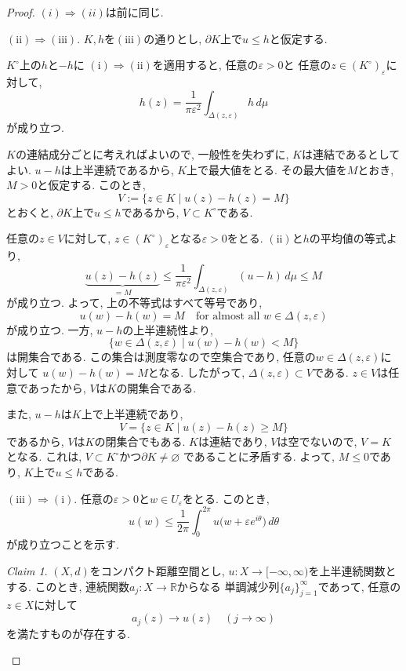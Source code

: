 \documentclass[dvipdfmx,a4paper,11pt]{report} %
\theoremstyle{definition}
\theoremstyle{remark}
\newtheorem{claim}[thm]{Claim}
\numberwithin{equation}{section}
\newcommand{\R}{\mathbb{R}}
\begin{document}
\begin{proof}
$(i) \Rightarrow (ii)$は前に同じ.

$\mathrm{(ii)} \Rightarrow \mathrm{(iii)}$.
$K,h$を$\mathrm{(iii)}$の通りとし,
$\partial K$上で$u \leq h$と仮定する.

$K^\circ$上の$h$と$-h$に
$\mathrm{(i)} \Rightarrow \mathrm{(ii)}$を適用すると,
任意の$\varepsilon > 0$と
任意の$z \in (K^\circ)_\varepsilon$に対して,
\[
h(z)
=
\frac{1}{\pi\varepsilon^2}
\int_{\Delta(z,\varepsilon)} h\,d\mu
\]
が成り立つ.

$K$の連結成分ごとに考えればよいので,
一般性を失わずに, $K$は連結であるとしてよい.
$u-h$は上半連続であるから,
$K$上で最大値をとる.
その最大値を$M$とおき, $M>0$と仮定する.
このとき,
\[
V:=\{z \in K \mid u(z)-h(z)=M\}
\]
とおくと, $\partial K$上で$u \leq h$であるから,
$V \subset K^\circ$である.

任意の$z \in V$に対して,
$z \in (K^\circ)_\varepsilon$となる$\varepsilon>0$をとる.
$\mathrm{(ii)}$と$h$の平均値の等式より,
\[
\underbrace{u(z)-h(z)}_{=M}
\leq
\frac{1}{\pi\varepsilon^2}
\int_{\Delta(z,\varepsilon)} (u-h)\,d\mu
\leq M
\]
が成り立つ.
よって, 上の不等式はすべて等号であり,
\[
u(w)-h(w)=M
\quad
\text{for almost all $w \in \Delta(z,\varepsilon)$}
\]
が成り立つ.
一方, $u-h$の上半連続性より,
\[
\{w \in \Delta(z,\varepsilon) \mid u(w)-h(w)<M\}
\]
は開集合である.
この集合は測度零なので空集合であり,
任意の$w \in \Delta(z,\varepsilon)$に対して
$u(w)-h(w)=M$となる.
したがって, $\Delta(z,\varepsilon) \subset V$である.
$z \in V$は任意であったから, $V$は$K$の開集合である.

また, $u-h$は$K$上で上半連続であり,
\[
V=\{z \in K \mid u(z)-h(z)\geq M\}
\]
であるから, $V$は$K$の閉集合でもある.
$K$は連結であり, $V$は空でないので, $V=K$となる.
これは, $V \subset K^\circ$かつ$\partial K \neq \varnothing$
であることに矛盾する.
よって, $M \leq 0$であり, $K$上で$u \leq h$である.

$\mathrm{(iii)} \Rightarrow \mathrm{(i)}$.
任意の$\varepsilon > 0$と$w \in U_\varepsilon$をとる.
このとき,
\[
u(w)
\leq
\frac{1}{2\pi}
\int_0^{2\pi}
u\bigl(w+\varepsilon e^{i\theta}\bigr)\,d\theta
\]
が成り立つことを示す.

\begin{tcolorbox}[mybox]
\begin{claim}
$(X,d)$をコンパクト距離空間とし,
$u \colon X \to [-\infty,\infty)$を上半連続関数とする.
このとき, 連続関数$a_j \colon X \to \R$からなる
単調減少列$\{a_j\}_{j=1}^{\infty}$であって,
任意の$z \in X$に対して
\[
a_j(z) \to u(z)
\quad (j \to \infty)
\]
を満たすものが存在する.
\end{claim}
\end{tcolorbox}


\end{proof}
\end{document}
